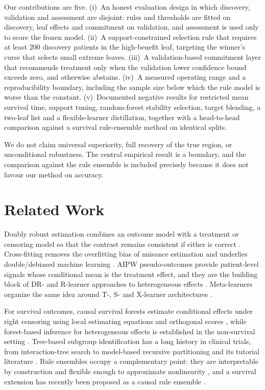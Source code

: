 \documentclass[conference]{IEEEtran}
\begin{document}
Our contributions are five.
(i)~An honest evaluation design in which discovery, validation and assessment
are disjoint: rules and thresholds are fitted on discovery, leaf effects and
commitment on validation, and assessment is used only to score the frozen
model.
(ii)~A support-constrained selection rule that requires at least 200 discovery
patients in the high-benefit leaf, targeting the winner's curse that selects
small extreme leaves.
(iii)~A validation-based commitment layer that recommends treatment only when
the validation lower confidence bound exceeds zero, and otherwise abstains.
(iv)~A measured operating range and a reproducibility boundary, including the
sample size below which the rule model is worse than the constant.
(v)~Documented negative results for restricted mean survival time, support
tuning, random-forest stability selection, target blending, a two-leaf list and
a flexible-learner distillation, together with a head-to-head comparison
against a survival rule-ensemble method on identical splits.

We do not claim universal superiority, full recovery of the true region, or
unconditional robustness. The central empirical result is a boundary, and the
comparison against the rule ensemble is included precisely because it does not
favour our method on accuracy.

\section{Related Work}

Doubly robust estimation combines an outcome model with a treatment or
censoring model so that the contrast remains consistent if either is correct
\cite{bang}. Cross-fitting removes the overfitting bias of nuisance estimation
and underlies double/debiased machine learning \cite{dml}. AIPW
pseudo-outcomes provide patient-level signals whose conditional mean is the
treatment effect, and they are the building block of DR- and R-learner
approaches to heterogeneous effects \cite{drlearner,nie}. Meta-learners
organize the same idea around T-, S- and X-learner architectures
\cite{kunzel}.

For survival outcomes, causal survival forests estimate conditional effects
under right censoring using local estimating equations and orthogonal scores
\cite{csf}, while forest-based inference for heterogeneous effects is
established in the non-survival setting \cite{wager}. Tree-based subgroup
identification has a long history in clinical trials, from interaction-tree
search \cite{foster} to model-based recursive partitioning and its tutorial
literature \cite{lipkovich}. Rule ensembles occupy a complementary point: they
are interpretable by construction and flexible enough to approximate
nonlinearity \cite{rulefit}, and a survival extension has recently been
proposed as a causal rule ensemble \cite{scre}.
\end{document}
